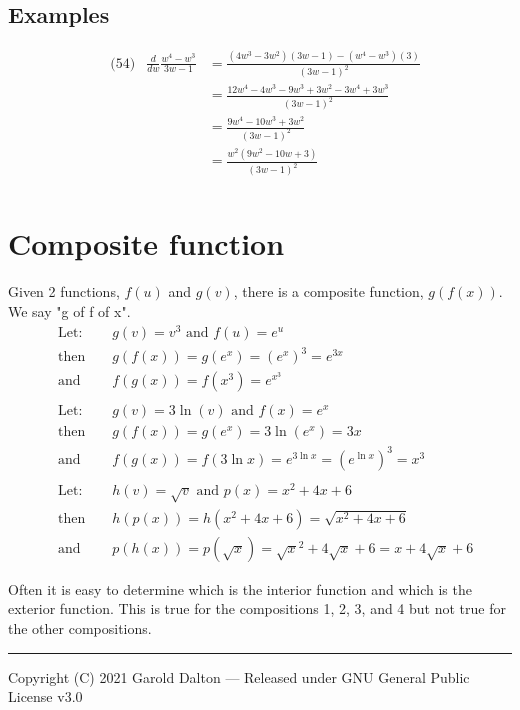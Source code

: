 \documentclass[14pt]{extarticle}
\begin{document}
\subsection*{Examples}
\begin{align*}
	&\text{(54)} &\frac{d}{dw} \frac{w^4 - w^3}{3w-1}&= \frac{(4w^3 - 3w^2)(3w-1) - (w^4 - w^3)(3)}{(3w-1)^2} \\
	&	&		&= \frac{12w^4- 4w^3 - 9w^3 + 3w^2 - 3w^4 + 3w^3}{(3w-1)^2} \\
	&	&		&=\frac{9w^4- 10w^3 + 3w^2 }{(3w-1)^2} \\
	&	&		&=\frac{w^2(9w^2- 10w + 3) }{(3w-1)^2} \\
\end{align*}


\section*{Composite function}
Given 2 functions, $f(u)$ and $g(v)$, there is a composite function, $g(f(x))$. We say "g of f of x".
\begin{align*}
	&\text{Let:} & &g(v) = v^3 \text{ and } f(u) = e^u \\
	&\text{then } & &g(f(x)) = g(e^x) = (e^x)^3 = e^{3x} \tag{1}\\
	&\text{and } & &f(g(x)) = f(x^3) = e^{x^3}	\tag{2}
\\\\
	&\text{Let:} & &g(v) = 3\ln(v) \text{ and } f(x) = e^x \\
	&\text{then } & &g(f(x)) = g(e^x) = 3\ln(e^x) = 3x \tag{3}\\
	&\text{and } & &f(g(x)) = f(3\ln x) = e^{3\ln x} = (e^{\ln x})^3 = x^3
\\\\
	&\text{Let:} & &h(v) = \sqrt{v} \text{ and } p(x) = x^2 + 4x + 6 \\
	&\text{then } & &h(p(x)) = h(x^2 + 4x + 6) = \sqrt{x^2 + 4x + 6} \tag{4}\\
	&\text{and } & &p(h(x)) = p(\sqrt{x}) = \sqrt{x}^2 +4\sqrt{x}+6 = x+4\sqrt{x}+6
\end{align*}

Often it is easy to determine which is the interior function and which is the exterior function. This is true for the compositions 1, 2, 3, and 4 but not true for the other compositions.

\noindent\rule{\textwidth}{1pt}
{\footnotesize Copyright (C) 2021 Garold Dalton --- Released under GNU General Public License v3.0}


\cleardoublepage
\end{document}
